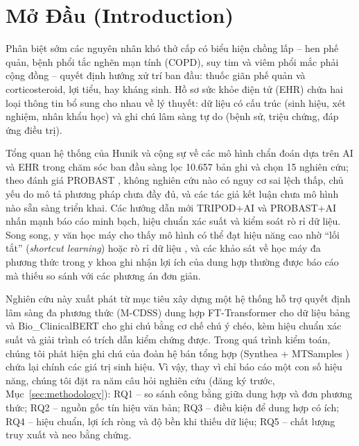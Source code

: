 \section{Mở Đầu (Introduction)}
\label{sec:introduction}

Phân biệt sớm các nguyên nhân khó thở cấp có biểu hiện chồng lấp -- hen phế quản, bệnh phổi tắc nghẽn mạn tính (COPD), suy tim và viêm phổi mắc phải cộng đồng -- quyết định hướng xử trí ban đầu: thuốc giãn phế quản và corticosteroid, lợi tiểu, hay kháng sinh. Hồ sơ sức khỏe điện tử (EHR) chứa hai loại thông tin bổ sung cho nhau về lý thuyết: dữ liệu có cấu trúc (sinh hiệu, xét nghiệm, nhân khẩu học) và ghi chú lâm sàng tự do (bệnh sử, triệu chứng, đáp ứng điều trị).

Tổng quan hệ thống của Hunik và cộng sự \cite{hunik2024diagnostic} về các mô hình chẩn đoán dựa trên AI và EHR trong chăm sóc ban đầu sàng lọc 10.657 bản ghi và chọn 15 nghiên cứu; theo đánh giá PROBAST \cite{collins2021protocol}, không nghiên cứu nào có nguy cơ sai lệch thấp, chủ yếu do mô tả phương pháp chưa đầy đủ, và các tác giả kết luận chưa mô hình nào sẵn sàng triển khai. Các hướng dẫn mới TRIPOD+AI \cite{collins2024tripod} và PROBAST+AI \cite{probastai2024bmj} nhấn mạnh báo cáo minh bạch, hiệu chuẩn xác suất và kiểm soát rò rỉ dữ liệu. Song song, y văn học máy cho thấy mô hình có thể đạt hiệu năng cao nhờ ``lối tắt'' (\emph{shortcut learning}) \cite{geirhos2020shortcut} hoặc rò rỉ dữ liệu \cite{kapoor2023leakage}, và các khảo sát về học máy đa phương thức trong y khoa \cite{huang2020multimodal,kline2022multimodal} ghi nhận lợi ích của dung hợp thường được báo cáo mà thiếu so sánh với các phương án đơn giản.

Nghiên cứu này xuất phát từ mục tiêu xây dựng một hệ thống hỗ trợ quyết định lâm sàng đa phương thức (M-CDSS) dung hợp FT-Transformer \cite{gorishniy2021revisiting} cho dữ liệu bảng và Bio\_ClinicalBERT \cite{alsentzer2019publicly} cho ghi chú bằng cơ chế chú ý chéo, kèm hiệu chuẩn xác suất \cite{guo2017calibration} và giải trình có trích dẫn kiểm chứng được. Trong quá trình kiểm toán, chúng tôi phát hiện ghi chú của đoàn hệ bán tổng hợp (Synthea \cite{walonoski2018synthea} + MTSamples \cite{mtsamples2012}) chứa lại chính các giá trị sinh hiệu. Vì vậy, thay vì chỉ báo cáo một con số hiệu năng, chúng tôi đặt ra năm câu hỏi nghiên cứu (đăng ký trước, Mục~\ref{sec:methodology}): RQ1 -- so sánh công bằng giữa dung hợp và đơn phương thức; RQ2 -- nguồn gốc tín hiệu văn bản; RQ3 -- điều kiện để dung hợp có ích; RQ4 -- hiệu chuẩn, lợi ích ròng và độ bền khi thiếu dữ liệu; RQ5 -- chất lượng truy xuất và neo bằng chứng.

